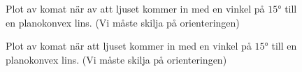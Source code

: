 \documentclass[a4paper]{article}
\begin{document}
\begin{figure}[h]
	\centering
	
	\caption{Plot av komat när av att ljuset kommer in med en vinkel på $15°$ till en planokonvex lins. (Vi måste skilja på orienteringen)}
	\label{fig:comP1}
\end{figure}
\begin{figure}[h]
	\centering
	
	\caption{Plot av komat när att ljuset kommer in med en vinkel på $15°$ till en planokonvex lins. (Vi måste skilja på orienteringen)}
	\label{fig:comM1}
\end{figure}

\FloatBarrier

 
 {}
 
\end{document}
